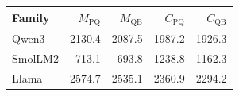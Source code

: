 \begin{tabular}{lrrrr}
\toprule
Family & $M_{\mathrm{PQ}}$ & $M_{\mathrm{QB}}$ & $C_{\mathrm{PQ}}$ & $C_{\mathrm{QB}}$ \\
\midrule
Qwen3 & 2130.4 & 2087.5 & 1987.2 & 1926.3 \\
SmolLM2 & 713.1 & 693.8 & 1238.8 & 1162.3 \\
Llama & 2574.7 & 2535.1 & 2360.9 & 2294.2 \\
\bottomrule
\end{tabular}
